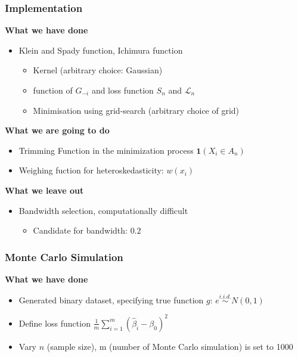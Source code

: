 \documentclass{beamer}
\begin{document}
\begin{frame}[t]
	\frametitle{Implementation}

	\textbf{What we have done}
	\begin{itemize}
		\item Klein and Spady function, Ichimura function 
		\begin{itemize}\item Kernel (arbitrary choice: Gaussian) 
			\item function of $G_{-i}$ and loss function $S_n$ and $\mathcal{L}_n$
			\item Minimisation using grid-search  (arbitrary choice of grid)
		\end{itemize}
	\end{itemize}
          \textbf{What we are going to do}
	\begin{itemize}
		\item Trimming Function in the minimization process $\mathbf{1}{(X_i \in A_n)}$
		\item Weighing fuction for heteroskedasticity: $w(x_i)$
	\end{itemize}

	\smallskip

	\textbf{What we leave out}
	\begin{itemize}
		\item Bandwidth selection, computationally difficult
		\begin{itemize}
			\item Candidate for bandwidth: $0.2$
		\end{itemize}
	\end{itemize}
	\note{~}
\end{frame}





\begin{frame}[t]
	\frametitle{Monte Carlo Simulation}

	\textbf{What we have done}
	\begin{itemize}
		\item Generated binary dataset, specifying true function $g$: $ e \overset{i.i.d.}{\sim} N(0, 1)$
		\item Define loss function $ \frac{1}{m}\sum_{i=1}^{m}(\hat{\beta}_i - \beta_0)^2 $
		\item Vary $n$ (sample size), m (number of Monte Carlo simulation) is set to 1000
     \end{itemize}
\end{frame}
\end{document}
